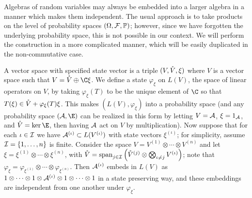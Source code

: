 %
Algebras of random variables may always be embedded into a larger algebra in a manner which makes them independent.
The usual approach is to take products on the level of probability spaces $(\Omega, \mathcal{F}, \mathbb{P})$; however, since we have forgotten the underlying probability space, this is not possible in our context.
We will perform the construction in a more complicated manner, which will be easily duplicated in the non-commutative case.

A vector space with specified state vector is a triple $(V, \mathring{V}, \xi)$ where $V$ is a vector space such that $V = \oV\oplus\C\xi$.
We define a state $\varphi_\xi$ on $L(V)$, the space of linear operators on $V$, by taking $\varphi_\xi(T)$ to be the unique element of $\C$ so that $T(\xi) \in \mathring{V} + \varphi_\xi(T)\xi$.
This makes $(L(V), \varphi_\xi)$ into a probability space (and any probability space $(\A, \E)$ can be realized in this form by letting $V = \mathcal{A}$, $\xi = 1_{\mathcal{A}}$, and $\oV = \ker\E$, then having $\mathcal{A}$ act on $V$ by multiplication).
Now suppose that for each $\iota \in \mathcal{I}$ we have $\mathcal{A}^{(\iota)} \subset L(V^{(\iota)})$ with state vectors $\xi^{(\iota)}$; for simplicity, assume $\mathcal{I} = \left\{1, \ldots, n\right\}$ is finite.
Consider the space $V = V^{(1)}\otimes\cdots\otimes V^{(n)}$ and let $\xi = \xi^{(1)}\otimes\cdots\otimes\xi^{(n)}$, with $\mathring{V} = \operatorname{span}_{j\in\mathcal{I}}\left(\mathring{V}^{(j)}\otimes\bigotimes_{\iota\neq j}V^{(\iota)}\right)$; note that $\varphi_\xi = \varphi_{\xi^{(1)}}\otimes\cdots\otimes\varphi_{\xi^{(n)}}$.
Then $\mathcal{A}^{(\iota)}$ embeds in $L(V)$ as $1\otimes\cdots\otimes1\otimes \mathcal{A}^{(\iota)} \otimes1\otimes\cdots\otimes1$ in a state preserving way, and these embeddings are independent from one another under $\varphi_\xi$.

